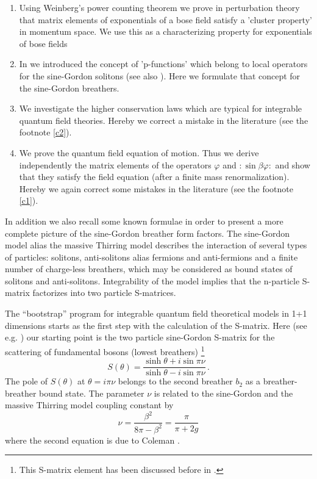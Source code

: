 \documentclass[a4paper,a4paper]{article}
\begin{document}
\begin{enumerate}
\item  Using Weinberg's power counting theorem we prove in perturbation
theory that matrix elements of exponentials of a bose field satisfy a
'cluster property' in momentum space. We use this as a characterizing
property for exponentials of bose fields

\item  In \cite{BK} we introduced the concept of 'p-functions' which belong
to local operators for the sine-Gordon solitons (see also \cite{Sm3,Ta}).
Here we formulate that concept for the sine-Gordon breathers.

\item  We investigate the higher conservation laws which are typical for
integrable quantum field theories. Hereby we correct a mistake in the
literature (see the footnote \ref{c2}).

\item  We prove the quantum field equation of motion. Thus we derive
independently the matrix elements of the operators $\varphi $ and $:\!\sin
\beta \varphi \!:$ and show that they satisfy the field equation (after a
finite mass renormalization). Hereby we again correct some mistakes in the
literature (see the footnote \ref{c1}).
\end{enumerate}

In addition we also recall some known formulae in order to present a more
complete picture of the sine-Gordon breather form factors. The sine-Gordon
model alias the massive Thirring model describes the interaction of several
types of particles: solitons, anti-solitons alias fermions and anti-fermions
and a finite number of charge-less breathers, which may be considered as
bound states of solitons and anti-solitons. Integrability of the model
implies that the n-particle S-matrix factorizes into two particle S-matrices.

The ``bootstrap'' program for integrable quantum field theoretical models in
1+1 dimensions starts as the first step with the calculation of the
S-matrix. Here (see e.g. \cite{KTTW,K2}) our starting point is the two
particle sine-Gordon S-matrix for the scattering of fundamental bosons
(lowest breathers) \cite{KT}\footnote{%
This S-matrix element has been discussed before in \cite{VG,AK}.} 
\[
S(\theta )=\dfrac{\sinh \theta +i\sin \pi \nu }{\sinh \theta -i\sin \pi \nu }%
\,. 
\]
The pole of $S(\theta )$ at $\theta =i\pi \nu $ belongs to the second
breather $b_{2}$ as a breather-breather bound state. The parameter $\nu $ is
related to the sine-Gordon and the massive Thirring model coupling constant
by 
\[
\nu =\frac{\beta ^{2}}{8\pi -\beta ^{2}}=\frac{\pi }{\pi +2g} 
\]
where the second equation is due to Coleman \cite{Co}.
\end{document}
